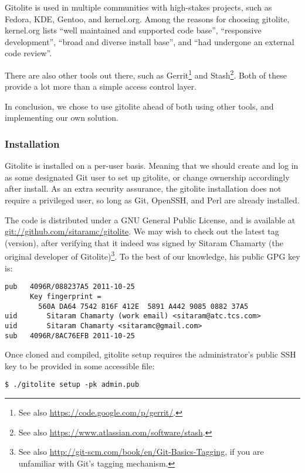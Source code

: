 Gitolite is used in multiple communities with high-stakes projects, such as
Fedora, KDE, Gentoo, and kernel.org\cite{gitolite-com-2014c}. Among the reasons
for choosing gitolite, kernel.org lists\cite{kernel-org-2014} ``well maintained
and supported code base'', ``responsive development'', ``broad and diverse
install base'', and ``had undergone an external code
review''\cite{gitolite-google-group-2011}.

There are also other tools out there, such as  Gerrit\footnote{See also
\url{https://code.google.com/p/gerrit/}.} and Stash\footnote{See also
\url{https://www.atlassian.com/software/stash}.}. Both of these provide a lot
more than a simple access control layer.

In conclusion, we chose to use gitolite ahead of both using other tools, and
implementing our own solution.

\subsubsection{Installation}

Gitolite is installed on a per-user basis. Meaning that we should create and
log in as some designated Git user to set up gitolite, or change ownership
accordingly after install. As an extra security assurance, the gitolite
installation does not require a privileged user, so long as Git, OpenSSH, and
Perl are already installed.

The code is distributed under a GNU General Public License, and is available at
\url{git://github.com/sitaramc/gitolite}. We may wish to check out the latest
tag (version), after verifying that it indeed was signed by Sitaram Chamarty
(the original developer of Gitolite)\footnote{See also
\url{http://git-scm.com/book/en/Git-Basics-Tagging}, if you are unfamiliar with
Git's tagging mechanism.}. To the best of our knowledge, his public GPG key is:

\begin{lstlisting}
pub   4096R/088237A5 2011-10-25
      Key fingerprint =
        560A DA64 7542 816F 412E  5891 A442 9085 0882 37A5
uid       Sitaram Chamarty (work email) <sitaram@atc.tcs.com>
uid       Sitaram Chamarty <sitaramc@gmail.com>
sub   4096R/8AC76EFB 2011-10-25
\end{lstlisting}

Once cloned and compiled, gitolite setup requires the administrator's public
SSH key to be provided in some accessible file:

\begin{lstlisting}
$ ./gitolite setup -pk admin.pub
\end{lstlisting}

